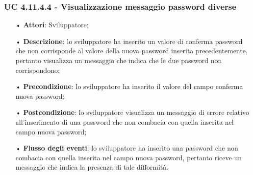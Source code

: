 \subsubsection{UC 4.11.4.4 - Visualizzazione messaggio password diverse}
\begin{itemize}
	\item[•]\textbf{Attori}: Sviluppatore;
	\item[•]\textbf{Descrizione}: lo sviluppatore ha inserito un valore di conferma password che non corrisponde al valore della nuova password inserita precedentemente, pertanto visualizza un messaggio che indica che le due password non corrispondono;
	\item[•]\textbf{Precondizione}: lo sviluppatore ha inserito il valore del campo conferma nuova password;
	\item[•]\textbf{Postcondizione}: lo sviluppatore visualizza un messaggio di errore relativo all'inserimento di una password che non combacia con quella inserita nel campo nuova password; 
	\item[•]\textbf{Flusso degli eventi}: lo sviluppatore ha inserito una password che non combacia con quella inserita nel campo nuova password, pertanto riceve un messaggio che indica la presenza di tale difformità.
\end{itemize}